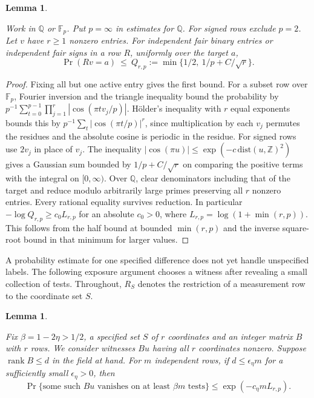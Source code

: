 \documentclass[11pt,letterpaper]{article}
\newtheorem{lemma}[theorem]{Lemma}
\numberwithin{equation}{section}
\begin{document}
\begin{lemma}\label{lem:point}

Work in $\mathbb Q$ or $\mathbb F_p$. Put $p=\infty$ in estimates for $\mathbb Q$. For signed
rows exclude $p=2$. Let $v$ have $r\ge1$ nonzero entries. For independent fair binary entries
or independent fair signs in a row $R$, uniformly over the target $a$,
\[
\Pr(Rv=a)\ \le\ Q_{r,p}:=\min\{1/2,\ 1/p+C/\sqrt r\}.
\]
\end{lemma}

\begin{proof}

Fixing all but one active entry gives the first bound. For a subset row over $\mathbb F_p$,
Fourier inversion and the triangle inequality bound the probability by
$p^{-1}\sum_{t=0}^{p-1}\prod_{j=1}^r|\cos(\pi t v_j/p)|$. Hölder's inequality with $r$ equal
exponents bounds this by $p^{-1}\sum_t|\cos(\pi t/p)|^r$, since multiplication by each $v_j$
permutes the residues and the absolute cosine is periodic in the residue. For signed rows use
$2v_j$ in place of $v_j$. The inequality $|\cos(\pi u)|\le\exp(-c\,\mathrm{dist}(u,\mathbb
Z)^2)$ gives a Gaussian sum bounded by $1/p+C/\sqrt r$ on comparing the positive terms with
the integral on $[0,\infty)$. Over $\mathbb Q$, clear denominators including that of the
target and reduce modulo arbitrarily large primes preserving all $r$ nonzero entries. Every
rational equality survives reduction. In particular $-\log Q_{r,p}\ge c_0 L_{r,p}$ for an
absolute $c_0>0$, where $L_{r,p}=\log(1+\min(r,p))$. This follows from the half bound at
bounded $\min(r,p)$ and the inverse square-root bound in that minimum for larger values.
\end{proof}

A probability estimate for one specified difference does not yet handle unspecified labels.
The following exposure argument chooses a witness after revealing a small collection of tests.
Throughout, $R_S$ denotes the restriction of a measurement row to the coordinate set $S$.

\begin{lemma}\label{lem:exposure}

Fix $\beta=1-2\eta>1/2$, a specified set $S$ of $r$ coordinates and an integer matrix $B$ with
$r$ rows. We consider witnesses $Bu$ having all $r$ coordinates nonzero. Suppose
$\operatorname{rank}B\le d$ in the field at hand. For $m$ independent rows, if
$d\le\epsilon_\eta m$ for a sufficiently small $\epsilon_\eta>0$, then
\[
\Pr\{\text{some such }Bu\text{ vanishes on at least }\beta m\text{ tests}\}
\le \exp(-c_\eta m L_{r,p}).
\]
\end{lemma}
\end{document}
